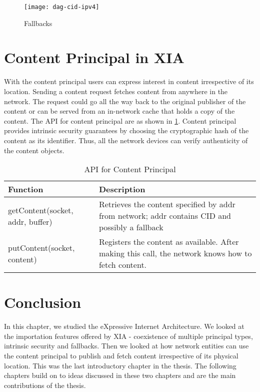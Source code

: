 \begin{figure}
  \begin{center}
    \texttt{[image: dag-cid-ipv4]}
    \caption{Fallbacks}
    \label{fig:dag_address}
  \end{center}
\end{figure}

\section{Content Principal in XIA}
With the content principal users can express interest in content
irrespective of its location. Sending a content request fetches
content from anywhere in the network. The request could go all the way
back to the original publisher of the content or can be served from an
in-network cache that holds a copy of the content. The API for content
principal are as shown in \ref{tab:cid_apis}. Content principal
provides intrinsic security guarantees by choosing the cryptographic
hash of the content as its identifier. Thus, all the network devices
can verify authenticity of the content objects.

\begin{table}
  \begin{center}
    \begin{tabular}
      { l  p{3in} }
      Function & Description \\
      \hline
      getContent(socket, addr, buffer) & Retrieves the content specified
      by addr from network; addr contains CID and possibly a fallback \\
      putContent(socket, content) & Registers the content as
      available. After making this call, the network knows how to
      fetch content. \\
      \hline
    \end{tabular}
  \end{center}
  \caption{API for Content Principal}
  \label{tab:cid_apis}
\end{table}

\section{Conclusion}
In this chapter, we studied the eXpressive Internet Architecture. We
looked at the importation features offered by XIA - coexistence of
multiple principal types, intrinsic security and fallbacks. Then we
looked at how network entities can use the content principal to
publish and fetch content irrespective of its physical location. This
was the last introductory chapter in the thesis. The following
chapters build on to ideas discussed in these two chapters and are the
main contributions of the thesis.
